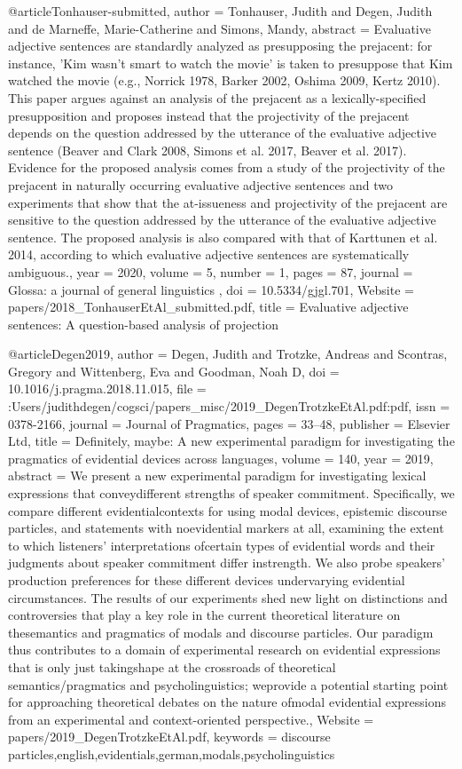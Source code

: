 {@article{Tonhauser-submitted,
author = {Tonhauser, Judith and Degen, Judith and de Marneffe, Marie-Catherine and Simons, Mandy},
abstract = {Evaluative adjective sentences are standardly analyzed as presupposing the prejacent: for instance, 'Kim wasn’t smart to watch the movie' is taken to presuppose that Kim watched the movie (e.g., Norrick 1978, Barker 2002, Oshima 2009, Kertz 2010). This paper argues against an analysis of the prejacent as a lexically-specified presupposition and proposes instead that the projectivity of the prejacent depends on the question addressed by the utterance of the evaluative adjective sentence (Beaver and Clark 2008, Simons et al. 2017, Beaver et al. 2017). Evidence for the proposed analysis comes from a study of the projectivity of the prejacent in naturally occurring evaluative adjective sentences and two experiments that show that the at-issueness and projectivity of the prejacent are sensitive to the question addressed by the utterance of the evaluative adjective sentence. The proposed analysis is also compared with that of Karttunen et al. 2014, according to which evaluative adjective sentences are systematically ambiguous.},
year = {2020},
volume = {5},
number = {1},
pages = {87},
journal = {Glossa: a journal of general linguistics },
doi = {10.5334/gjgl.701},
Website = {papers/2018_TonhauserEtAl_submitted.pdf},
title = {{Evaluative adjective sentences: A question-based analysis of projection}}
}

@article{Degen2019,
author = {Degen, Judith and Trotzke, Andreas and Scontras, Gregory and Wittenberg, Eva and Goodman, Noah D},
doi = {10.1016/j.pragma.2018.11.015},
file = {:Users/judithdegen/cogsci/papers{\_}misc/2019{\_}DegenTrotzkeEtAl.pdf:pdf},
issn = {0378-2166},
journal = {Journal of Pragmatics},
pages = {33--48},
publisher = {Elsevier Ltd},
title = {{Definitely, maybe: A new experimental paradigm for investigating the pragmatics of evidential devices across languages}},
volume = {140},
year = {2019},
abstract = {We present a new experimental paradigm for investigating lexical expressions that conveydifferent strengths of speaker commitment. Specifically, we compare different evidentialcontexts for using modal devices, epistemic discourse particles, and statements with noevidential markers at all, examining the extent to which listeners' interpretations ofcertain types of evidential words and their judgments about speaker commitment differ instrength. We also probe speakers' production preferences for these different devices undervarying evidential circumstances. The results of our experiments shed new light on distinctions and controversies that play a key role in the current theoretical literature on thesemantics and pragmatics of modals and discourse particles. Our paradigm thus contributes to a domain of experimental research on evidential expressions that is only just takingshape at the crossroads of theoretical semantics/pragmatics and psycholinguistics; weprovide a potential starting point for approaching theoretical debates on the nature ofmodal evidential expressions from an experimental and context-oriented perspective.},
Website = {papers/2019_DegenTrotzkeEtAl.pdf},
keywords = {discourse particles,english,evidentials,german,modals,psycholinguistics}
}

}
